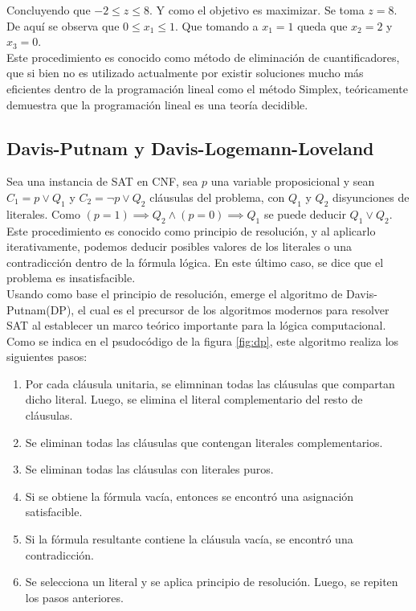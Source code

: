\documentclass[12pt]{report}
\begin{document}
Concluyendo que $-2\leq  z \leq  8$. Y como el objetivo es maximizar. Se toma $z=8$. De aquí se observa que $0\leq  x_1 \leq 1$. Que tomando a $x_1=1$ queda que $x_2=2$ y $x_3 = 0$.\\

Este procedimiento es conocido como método de eliminación de cuantificadores, que si bien no es utilizado actualmente por existir soluciones mucho más eficientes dentro de la programación lineal como el método Simplex, teóricamente demuestra que la programación lineal es una teoría decidible.

\subsection{Davis-Putnam y Davis-Logemann-Loveland}

Sea una instancia de SAT en CNF, sea $p$ una variable proposicional y sean $C_1=p \lor  Q_1$  y  $C_2 = \neg p \lor  Q_2$ cláusulas del problema, con $Q_1$ y $Q_2$ disyunciones de literales. Como $(p=1)\implies  Q_2 \land (p=0)\implies  Q_1$ se puede deducir $Q_1\lor  Q_2$. Este procedimiento es conocido como principio de resolución, y al aplicarlo iterativamente, podemos deducir posibles valores de los literales o una contradicción dentro de la fórmula lógica. En este último caso, se dice que el problema es insatisfacible.\\ 

Usando como base el principio de resolución, emerge el algoritmo de Davis-Putnam(DP), el cual es el precursor de los algoritmos modernos para resolver SAT al establecer  un marco teórico importante para la lógica computacional. Como se indica en el psudocódigo de la figura \ref{fig:dp}, este algoritmo realiza los siguientes pasos:
\begin{enumerate}
    \item Por cada cláusula  unitaria, se elimninan todas las cláusulas que compartan dicho literal. Luego, se elimina el literal complementario del resto de cláusulas.
    \item Se eliminan todas las cláusulas que contengan literales complementarios.
    \item Se eliminan todas las cláusulas con literales puros.
    \item Si se obtiene la fórmula vacía, entonces se encontró una asignación satisfacible. 
    \item Si la fórmula resultante contiene la cláusula vacía, se encontró una contradicción.
    \item Se selecciona un literal y se aplica principio de resolución. Luego, se repiten los pasos anteriores.
\end{enumerate}
\end{document}
